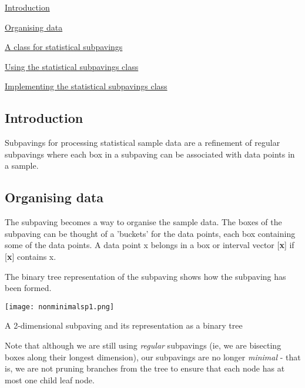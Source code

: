 
\begin{DoxyItemize}
\item \hyperlink{StatsSubPavings_statssec_intro}{\-Introduction}
\item \hyperlink{StatsSubPavings_statssec_organising}{\-Organising data}
\item \hyperlink{StatsSubPavings_statssec_statsclass}{\-A class for statistical subpavings}
\item \hyperlink{StatsSubPavings_statssec_usingStatsClass}{\-Using the statistical subpavings class}
\item \hyperlink{StatsSubPavings_statssec_technicalities}{\-Implementing the statistical subpavings class}
\end{DoxyItemize}



\hypertarget{StatsSubPavings_statssec_intro}{}\subsection{\-Introduction}\label{StatsSubPavings_statssec_intro}
\-Subpavings for processing statistical sample data are a refinement of regular subpavings where each box in a subpaving can be associated with data points in a sample.



\hypertarget{StatsSubPavings_statssec_organising}{}\subsection{\-Organising data}\label{StatsSubPavings_statssec_organising}
\-The subpaving becomes a way to organise the sample data. \-The boxes of the subpaving can be thought of a 'buckets' for the data points, each box containing some of the data points. \-A data point x belongs in a box or interval vector \mbox{[}{\bfseries x}\mbox{]} if \mbox{[}{\bfseries x}\mbox{]} contains x.

\-The binary tree representation of the subpaving shows how the subpaving has been formed.

 
\begin{DoxyImage}
\texttt{[image: nonminimalsp1.png]}
\caption{\-A 2-\/dimensional subpaving and its representation as a binary tree}
\end{DoxyImage}


\-Note that although we are still using {\itshape regular\/} subpavings (ie, we are bisecting boxes along their longest dimension), our subpavings are no longer {\itshape minimal\/} -\/ that is, we are not pruning branches from the tree to ensure that each node has at most one child leaf node.

